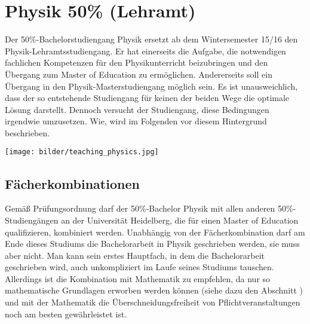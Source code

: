 \section{Physik 50\% (Lehramt)} %

Der 50\%-Bachelorstudiengang Physik ersetzt ab dem Wintersemester 15/16 den Physik-Lehramtsstudiengang. Er hat einerseits die Aufgabe, die notwendigen fachlichen Kompetenzen für den Physikunterricht beizubringen und den Übergang zum Master of Education zu ermöglichen. Andererseits soll ein Übergang in den Physik-Masterstudiengang möglich sein. Es ist unausweichlich, dass der so entstehende Studiengang für keinen der beiden Wege die optimale Lösung darstellt. Dennoch versucht der Studiengang, diese Bedingungen irgendwie umzusetzen. Wie, wird im Folgenden vor diesem Hintergrund beschrieben.

\begin{figure*}[b]
    \centering
    \texttt{[image: bilder/teaching\_physics.jpg]}
\end{figure*}

\vspace{-2mm}
\subsection{Fächerkombinationen}
\vspace{-1mm}

Gemäß Prüfungsordnung darf der 50\%-Bachelor Physik mit allen anderen 50\%-Studiengängen an der Universität Heidelberg, die für einen Master of Education qualifizieren, kombiniert werden. Unabhängig von der Fächerkombination darf am Ende dieses Studiums die Bachelorarbeit in Physik geschrieben werden, sie muss aber nicht. Man kann sein erstes Hauptfach, in dem die Bachelorarbeit geschrieben wird, auch unkompliziert im Laufe seines Studiums tauschen. Allerdings ist die Kombination mit Mathematik zu empfehlen, da nur so mathematische Grundlagen erworben werden können (siehe dazu den Abschnitt ) und mit der Mathematik die Überschneidungsfreiheit von Pflichtveranstaltungen noch am besten gewährleistet ist.

\vspace{-2mm}
